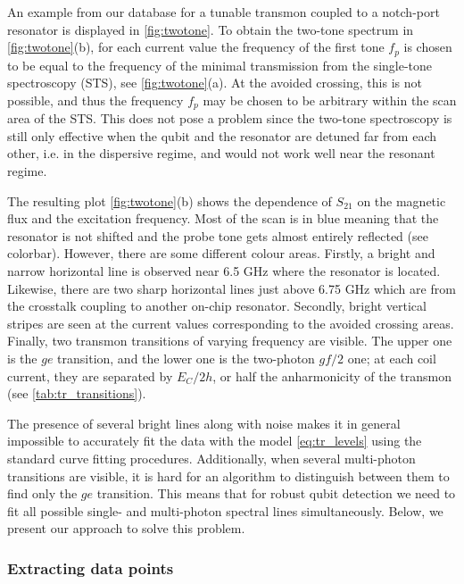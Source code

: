 \documentclass[%
 aip,
 amsmath,amssymb,
 reprint,%
]{revtex4-1}
\begin{document}
An example from our database for a tunable transmon coupled to a notch-port resonator is displayed in \autoref{fig:twotone}. To obtain the two-tone spectrum in \autoref{fig:twotone}(b), for each current value the frequency of the first tone $f_p$ is chosen to be equal to the frequency of the minimal transmission from the single-tone spectroscopy (STS), see \autoref{fig:twotone}(a). At the avoided crossing, this is not possible, and thus the frequency $f_p$ may be chosen to be arbitrary within the scan area of the STS. This does not pose a problem since the two-tone spectroscopy is still only effective when the qubit and the resonator are detuned far from each other, i.e. in the dispersive regime\cite{blais2004}, and would not work well near the resonant regime.

The resulting plot \autoref{fig:twotone}(b) shows the dependence of $S_{21}$ on the magnetic flux and the excitation frequency. Most of the scan is in blue meaning that the resonator is not shifted and the probe tone gets almost entirely reflected (see colorbar). However, there are some different colour areas. Firstly, a bright and narrow horizontal line is observed near 6.5 GHz where the resonator is located. Likewise, there are two sharp horizontal lines just above 6.75 GHz which are from the crosstalk coupling to another on-chip resonator. Secondly, bright vertical stripes are seen at the current values corresponding to the avoided crossing areas. Finally, two transmon transitions of varying frequency are visible. The upper one is the $ge$ transition, and the lower one is the two-photon $gf/2$ one; at each coil current, they are separated by $E_C/2h$, or half the anharmonicity of the transmon (see \autoref{tab:tr_transitions}).

The presence of several bright lines along with noise makes it in general impossible to accurately fit the data with the model \eqref{eq:tr_levels} using the standard curve fitting procedures. Additionally, when several multi-photon transitions are visible, it is hard for an algorithm to distinguish between them to find only the $ge$ transition. This means that for robust qubit detection we need to fit all possible single- and multi-photon spectral lines simultaneously. Below, we present our approach to solve this problem.



\subsubsection{Extracting data points}
\end{document}
